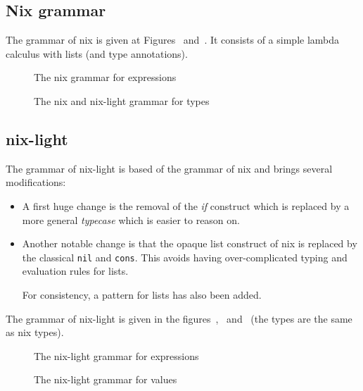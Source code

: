 \subsection{Nix grammar}
\label{sec:nix-grammar}

The grammar of nix is given at Figures~
and~. It consists of a simple lambda calculus with lists (and type annotations).

\begin{figure}
  
  \caption{\label{grammar::nix}The nix grammar for expressions}
\end{figure}

\begin{figure}
  
  \caption{\label{grammar::types}The nix and nix-light grammar for types}
\end{figure}

\subsection{nix-light}
\label{sec:nix-light-grammar}

The grammar of nix-light is based of the grammar of nix and brings several
modifications:
\begin{itemize}
  \item A first huge change is the removal of the \emph{if} construct which is
    replaced by a more general \emph{typecase} which is easier to reason on.

  \item Another notable change is that the opaque list construct of nix is
    replaced by the classical \texttt{nil} and \texttt{cons}.
    This avoids having over-complicated typing and evaluation rules for lists.

    For consistency, a pattern for lists has also been added.
\end{itemize}

The grammar of nix-light is given in the
figures~,~
and~ (the types are the same as nix types).

\begin{figure}
  
  \caption{\label{grammar::expressions}The nix-light grammar for expressions}
\end{figure}

\begin{figure}
  
  \caption{\label{grammar::values}The nix-light grammar for values}
\end{figure}
